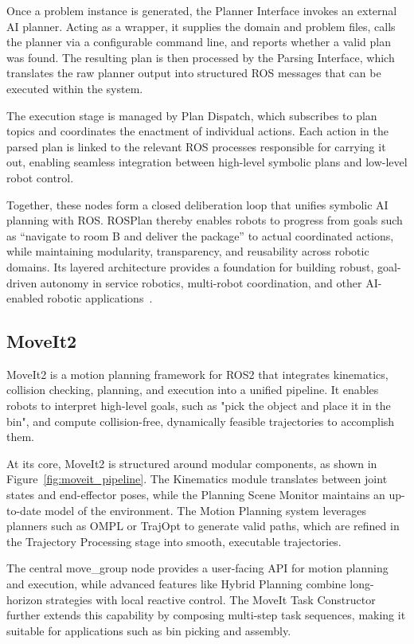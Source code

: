 \documentclass[12pt]{extarticle}
\begin{document}
Once a problem instance is generated, the Planner Interface invokes an external AI planner. Acting as a wrapper, it supplies the domain and problem files, calls the planner via a configurable command line, and reports whether a valid plan was found. The resulting plan is then processed by the Parsing Interface, which translates the raw planner output into structured ROS messages that can be executed within the system.

The execution stage is managed by Plan Dispatch, which subscribes to plan topics and coordinates the enactment of individual actions. Each action in the parsed plan is linked to the relevant ROS processes responsible for carrying it out, enabling seamless integration between high-level symbolic plans and low-level robot control.

Together, these nodes form a closed deliberation loop that unifies symbolic AI planning with ROS. ROSPlan thereby enables robots to progress from goals such as “navigate to room B and deliver the package” to actual coordinated actions, while maintaining modularity, transparency, and reusability across robotic domains. Its layered architecture provides a foundation for building robust, goal-driven autonomy in service robotics, multi-robot coordination, and other AI-enabled robotic applications~\cite{ros-plan}.

\subsection{MoveIt2}

MoveIt2 is a motion planning framework for ROS2 that integrates kinematics, collision checking, planning, and execution into a unified pipeline. It enables robots to interpret high-level goals, such as "pick the object and place it in the bin", and compute collision-free, dynamically feasible trajectories to accomplish them.

At its core, MoveIt2 is structured around modular components, as shown in Figure~\ref{fig:moveit_pipeline}. The Kinematics module translates between joint states and end-effector poses, while the Planning Scene Monitor maintains an up-to-date model of the environment. The Motion Planning system leverages planners such as OMPL or TrajOpt to generate valid paths, which are refined in the Trajectory Processing stage into smooth, executable trajectories.

The central move\_group node provides a user-facing API for motion planning and execution, while advanced features like Hybrid Planning combine long-horizon strategies with local reactive control. The MoveIt Task Constructor further extends this capability by composing multi-step task sequences, making it suitable for applications such as bin picking and assembly.
\end{document}
